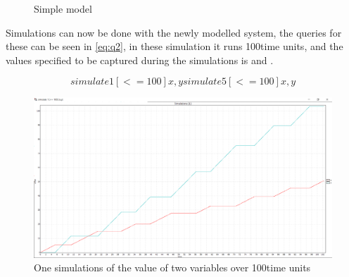 \begin{figure}[H]
	\centering
	\caption{Simple model}
	\label{fig:showcase01}
\end{figure}

Simulations can now be done with the newly modelled system, the queries for these can be seen in \cref{eq:q2}, in these simulation it runs 100time units, and the values specified to be captured during the simulations is  and .

\begin{equation}\label{eq:q2}
simulate 1 [<= 100] {x,y}
simulate 5 [<= 100] {x,y}
\end{equation}

\begin{figure}[!h]
	\includegraphics[width=\textwidth]{graphics/showcase01.png}
	\caption{One simulations of the value of two variables  over 100time units}
	\label{fig:sim01}
\end{figure}

